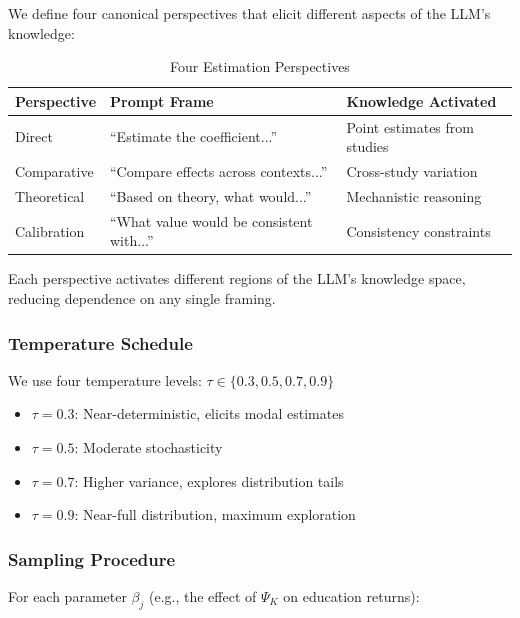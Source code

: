 We define four canonical perspectives that elicit different aspects of the LLM's knowledge:

\begin{table}[htbp]
\centering
\caption{Four Estimation Perspectives}
\label{tab:perspectives}
\small
\begin{tabular}{@{}lll@{}}
\toprule
\textbf{Perspective} & \textbf{Prompt Frame} & \textbf{Knowledge Activated} \\
\midrule
Direct & ``Estimate the coefficient...'' & Point estimates from studies \\
Comparative & ``Compare effects across contexts...'' & Cross-study variation \\
Theoretical & ``Based on theory, what would...'' & Mechanistic reasoning \\
Calibration & ``What value would be consistent with...'' & Consistency constraints \\
\bottomrule
\end{tabular}
\end{table}

Each perspective activates different regions of the LLM's knowledge space, reducing dependence on any single framing.

\subsubsection{Temperature Schedule}

We use four temperature levels: $\tau \in \{0.3, 0.5, 0.7, 0.9\}$

\begin{itemize}
    \item $\tau = 0.3$: Near-deterministic, elicits modal estimates
    \item $\tau = 0.5$: Moderate stochasticity
    \item $\tau = 0.7$: Higher variance, explores distribution tails
    \item $\tau = 0.9$: Near-full distribution, maximum exploration
\end{itemize}

\subsubsection{Sampling Procedure}

For each parameter $\beta_j$ (e.g., the effect of $\Psi_K$ on education returns):

